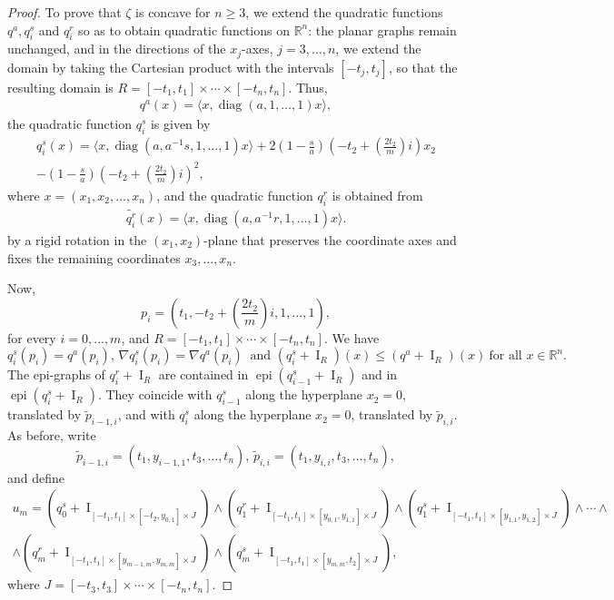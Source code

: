 \documentclass[11pt]{article}
\theoremstyle{definition} %
\DeclareMathOperator{\I}{I}
\DeclareMathOperator{\diag}{diag}
\DeclareMathOperator{\epi}{epi}
\begin{document}
\begin{proof}
To prove that $\zeta$ is concave for $n\geq 3$, we extend the quadratic functions $q^a, q_i^s$ and $q_i^r$ so as to obtain quadratic functions on $\mathbb{R}^n$: the planar graphs remain unchanged, and in  the directions of the $x_j$-axes, $j=3, \dots, n$, we extend the domain by taking the Cartesian product with the intervals $[-t_j,t_j]$, so that the resulting domain is
$
R = [-t_1,t_1]\times \cdots \times [-t_n,t_n].
$
Thus, 
\begin{align*}
    q^a(x)= \langle  x, \diag(a,1, \dots, 1)x\rangle,
\end{align*}
the quadratic function $q_i^s$ is given by 
\begin{multline*}
    q_i^s(x)= \langle x, \diag (a, a^{-1}s, 1,\dots, 1)x\rangle + 2\left(1-\frac{s}{a}\right)\left(-t_2+\left(\frac{2t_2}{m}\right)i\right)x_2\\
   \nonumber -\left(1-\frac{s}{a}\right)\left(-t_2+\left(\frac{2t_2}{m}\right)i\right)^2,
\end{multline*}
where $x= (x_1,x_2, \dots, x_n)$, and the quadratic function $q_i^r$ is obtained from 
\begin{align*}
    \tilde{q^r_i}(x)= \langle x, \diag(a, a^{-1}r, 1,\dots, 1)x\rangle.
\end{align*}
by a rigid rotation in the $(x_1,x_2)$-plane that preserves the coordinate axes and fixes the remaining coordinates $x_3,\dots,x_n$.


Now,
$$p_i=\left(t_1, -t_2+\left(\frac{2t_2}{m}\right)i, 1,\dots, 1\right),$$
for every $i=0, \dots, m$, and  $R= [-t_1,t_1]\times \cdots \times [-t_n,t_n]$. We have 
$$q_i^s(p_i)=q^a(p_i),\, \nabla q_i^s(p_i)= \nabla q^a(p_i) \ \mbox{ and } (q_i^s+\I_R)(x)  \leq (q^a+\I_R)(x) \ \mbox{for all } x\in \mathbb{R}^n.$$
The epi-graphs of $q_i^r+\I_R$ are contained in $\epi(q_{i-1}^s+\I_R)$ and in  $\epi(q_{i}^s+\I_R)$. They coincide with $q_{i-1}^s$ along the hyperplane $x_2=0$, translated by $\tilde{p}_{i-1,i}$, and  with $q_{i}^s$ along the hyperplane $x_2=0$, translated by $\tilde{p}_{i,i}$. As before, write 
$$\tilde{p}_{i-1,i}= (t_1, y_{i-1,1}, t_3, \dots, t_n),\, \tilde{p}_{i,i}= (t_1, y_{i,i}, t_3,\dots, t_n),$$ 
and define 
\begin{multline*}
u_m= (q_0^s+\I_{[-t_1,t_1]\times [-t_2, y_{0,1}]\times J })\wedge (q_1^r+\I_{[-t_1,t_1]\times [ y_{0,1}, y_{1,1}]\times J})\wedge (q_1^s+\I_{[-t_1,t_1]\times [ y_{1,1}, y_{1,2}]\times J})\wedge\cdots\wedge\\
\wedge (q_m^r+\I_{[-t_1,t_1]\times [ y_{m-1,m}, y_{m,m}]\times J})\wedge (q_m^s+\I_{[-t_1,t_1]\times [ y_{m,m}, t_2]\times J}),
\end{multline*}
where $J=[-t_3,t_3]\times \cdots \times [-t_n,t_n]$. 
\medskip


\end{proof}
\end{document}
